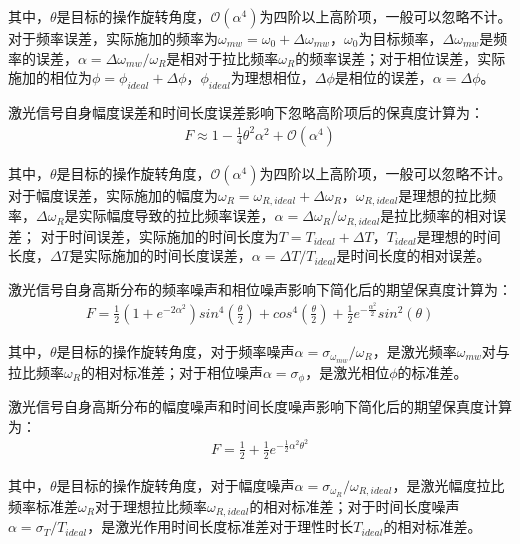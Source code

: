 其中，$\theta$是目标的操作旋转角度，$\mathcal{O}\left(\alpha^4\right)$为四阶以上高阶项，一般可以忽略不计。对于频率误差，实际施加的频率为$\omega_{mw}=\omega_0+\Delta\omega_{mw}$，$\omega_0$为目标频率，$\Delta\omega_{mw}$是频率的误差，$\alpha=\Delta\omega_{mw}/\omega_R$是相对于拉比频率$\omega_R$的频率误差；对于相位误差，实际施加的相位为$\phi=\phi_{ideal}+\Delta\phi$，$\phi_{ideal}$为理想相位，$\Delta\phi$是相位的误差，$\alpha=\Delta\phi$。

激光信号自身幅度误差和时间长度误差影响下忽略高阶项后的保真度计算为：
\begin{align}
    F\approx 1-\frac{1}{4}\theta^2\alpha^2+\mathcal{O}\left(\alpha^4\right)
\end{align}

其中，$\theta$是目标的操作旋转角度，$\mathcal{O}\left(\alpha^4\right)$为四阶以上高阶项，一般可以忽略不计。对于幅度误差，实际施加的幅度为$\omega_R=\omega_{R,ideal}+\Delta\omega_R$，$\omega_{R,ideal}$是理想的拉比频率，$\Delta\omega_R$是实际幅度导致的拉比频率误差，$\alpha=\Delta\omega_R/\omega_{R,ideal}$是拉比频率的相对误差；
对于时间误差，实际施加的时间长度为$T=T_{ideal}+\Delta T$，$T_{ideal}$是理想的时间长度，$\Delta T$是实际施加的时间长度误差，$\alpha=\Delta T/T_{ideal}$是时间长度的相对误差。

激光信号自身高斯分布的频率噪声和相位噪声影响下简化后的期望保真度计算为：
\begin{align}
    F=\frac{1}{2}\left(1+e^{-2\alpha^2}\right) sin^4\left(\frac{\theta}{2}\right)+cos^4\left(\frac{\theta}{2}\right)+\frac{1}{2} e^{-\frac{\alpha^2}{2}} sin^2\left(\theta\right)\label{eq:frequency_noise_fidelity}
\end{align}

其中，$\theta$是目标的操作旋转角度，对于频率噪声$\alpha=\sigma_{\omega_{mw}}/\omega_{R}$，是激光频率$\omega_{mw}$对与拉比频率$\omega_R$的相对标准差；对于相位噪声$\alpha=\sigma_{\phi}$，是激光相位$\phi$的标准差。

激光信号自身高斯分布的幅度噪声和时间长度噪声影响下简化后的期望保真度计算为：
\begin{align}
    F=\frac{1}{2}+\frac{1}{2} e^{-\frac{1}{2}\alpha^2\theta^2}\label{eq:amplitude_noise_fidelity}
\end{align}

其中，$\theta$是目标的操作旋转角度，对于幅度噪声$\alpha=\sigma_{\omega_R}/\omega_{R,ideal}$，是激光幅度拉比频率标准差$\omega_R$对于理想拉比频率$\omega_{R,ideal}$的相对标准差；对于时间长度噪声$\alpha=\sigma_{T}/T_{ideal}$，是激光作用时间长度标准差对于理性时长$T_{ideal}$的相对标准差。

